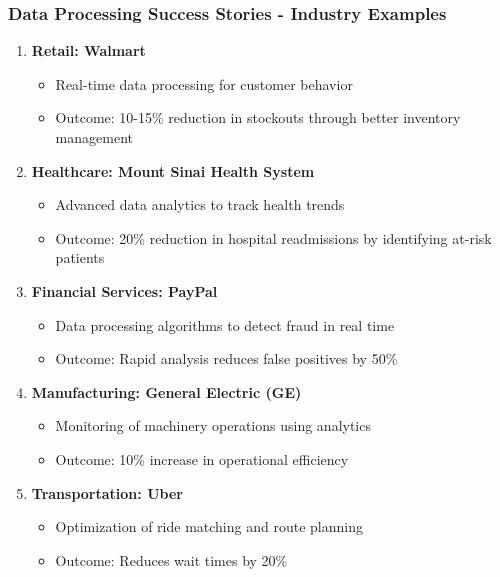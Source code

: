 \documentclass[aspectratio=169]{beamer}
\begin{document}
\begin{frame}[fragile]
    \frametitle{Data Processing Success Stories - Industry Examples}
    \begin{enumerate}
        \item \textbf{Retail: Walmart}
            \begin{itemize}
                \item Real-time data processing for customer behavior
                \item Outcome: 10-15\% reduction in stockouts through better inventory management
            \end{itemize}
        \item \textbf{Healthcare: Mount Sinai Health System}
            \begin{itemize}
                \item Advanced data analytics to track health trends
                \item Outcome: 20\% reduction in hospital readmissions by identifying at-risk patients
            \end{itemize}
        \item \textbf{Financial Services: PayPal}
            \begin{itemize}
                \item Data processing algorithms to detect fraud in real time
                \item Outcome: Rapid analysis reduces false positives by 50\%
            \end{itemize}
        \item \textbf{Manufacturing: General Electric (GE)}
            \begin{itemize}
                \item Monitoring of machinery operations using analytics
                \item Outcome: 10\% increase in operational efficiency
            \end{itemize}
        \item \textbf{Transportation: Uber}
            \begin{itemize}
                \item Optimization of ride matching and route planning
                \item Outcome: Reduces wait times by 20\%
            \end{itemize}
    \end{enumerate}
\end{frame}
\end{document}
